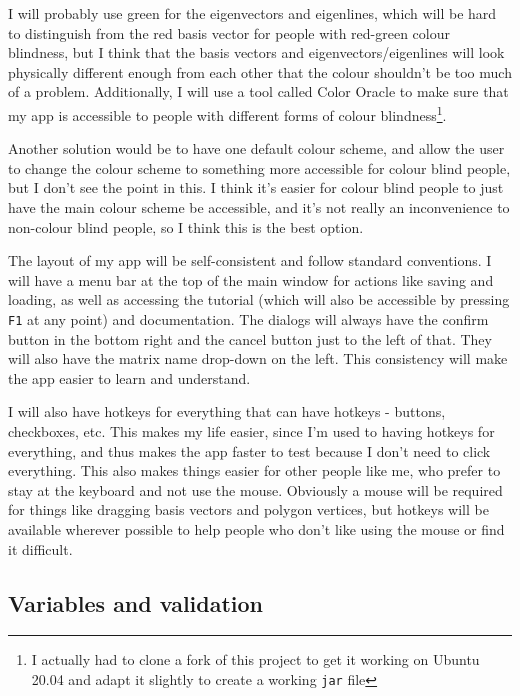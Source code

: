 \documentclass[../main.tex]{subfiles}
\begin{document}
I will probably use green for the eigenvectors and eigenlines, which will be hard to distinguish from the red basis vector for people with red-green colour blindness, but I think that the basis vectors and eigenvectors/eigenlines will look physically different enough from each other that the colour shouldn't be too much of a problem. Additionally, I will use a tool called Color Oracle\cite{colororacle.org} to make sure that my app is accessible to people with different forms of colour blindness\footnote{I actually had to clone a fork of this project\cite{color-oracle-dorkbox-fork} to get it working on Ubuntu 20.04 and adapt it slightly to create a working \texttt{jar} file}.

Another solution would be to have one default colour scheme, and allow the user to change the colour scheme to something more accessible for colour blind people, but I don't see the point in this. I think it's easier for colour blind people to just have the main colour scheme be accessible, and it's not really an inconvenience to non-colour blind people, so I think this is the best option.

The layout of my app will be self-consistent and follow standard conventions. I will have a menu bar at the top of the main window for actions like saving and loading, as well as accessing the tutorial (which will also be accessible by pressing \texttt{F1} at any point) and documentation. The dialogs will always have the confirm button in the bottom right and the cancel button just to the left of that. They will also have the matrix name drop-down on the left. This consistency will make the app easier to learn and understand.

I will also have hotkeys for everything that can have hotkeys - buttons, checkboxes, etc. This makes my life easier, since I'm used to having hotkeys for everything, and thus makes the app faster to test because I don't need to click everything. This also makes things easier for other people like me, who prefer to stay at the keyboard and not use the mouse. Obviously a mouse will be required for things like dragging basis vectors and polygon vertices, but hotkeys will be available wherever possible to help people who don't like using the mouse or find it difficult.

\subsection{Variables and validation\label{subsection:variables-and-validation}}
\end{document}
